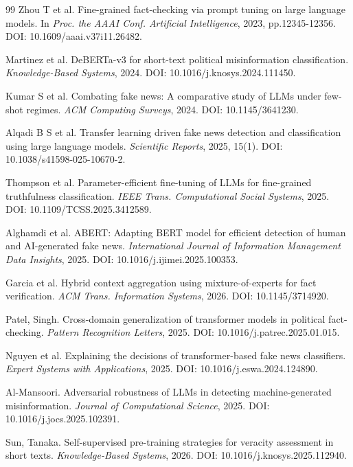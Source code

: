 \documentclass[10pt,twocolumn,twoside,a4paper]{article}
\begin{document}
\begin{thebibliography}{99}
Zhou T et al. Fine-grained fact-checking via prompt tuning on large language
models. In \emph{Proc. the AAAI Conf. Artificial Intelligence}, 2023,
pp.12345-12356. DOI: 10.1609/aaai.v37i11.26482.

Martinez et al. DeBERTa-v3 for short-text political misinformation
classification. \emph{Knowledge-Based Systems}, 2024.
DOI: 10.1016/j.knosys.2024.111450.

Kumar S et al. Combating fake news: A comparative study of LLMs under few-shot
regimes. \emph{ACM Computing Surveys}, 2024. DOI: 10.1145/3641230.

Alqadi B S et al. Transfer learning driven fake news detection and
classification using large language models. \emph{Scientific Reports}, 2025,
15(1). DOI: 10.1038/s41598-025-10670-2.

Thompson et al. Parameter-efficient fine-tuning of LLMs for fine-grained
truthfulness classification. \emph{IEEE Trans. Computational Social Systems},
2025. DOI: 10.1109/TCSS.2025.3412589.

Alghamdi et al. ABERT: Adapting BERT model for efficient detection of human and
AI-generated fake news. \emph{International Journal of Information Management
Data Insights}, 2025. DOI: 10.1016/j.ijimei.2025.100353.

Garcia et al. Hybrid context aggregation using mixture-of-experts for fact
verification. \emph{ACM Trans. Information Systems}, 2026.
DOI: 10.1145/3714920.

Patel, Singh. Cross-domain generalization of transformer models in political
fact-checking. \emph{Pattern Recognition Letters}, 2025.
DOI: 10.1016/j.patrec.2025.01.015.

Nguyen et al. Explaining the decisions of transformer-based fake news
classifiers. \emph{Expert Systems with Applications}, 2025.
DOI: 10.1016/j.eswa.2024.124890.

Al-Mansoori. Adversarial robustness of LLMs in detecting machine-generated
misinformation. \emph{Journal of Computational Science}, 2025.
DOI: 10.1016/j.jocs.2025.102391.

Sun, Tanaka. Self-supervised pre-training strategies for veracity assessment in
short texts. \emph{Knowledge-Based Systems}, 2026.
DOI: 10.1016/j.knosys.2025.112940.


\end{thebibliography}
\end{document}
